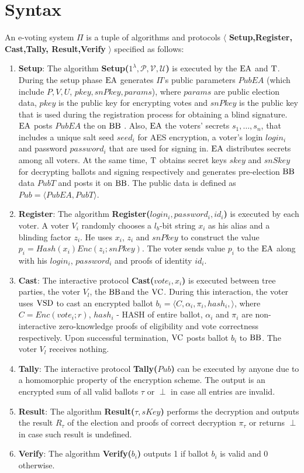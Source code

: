 \section{Syntax}
An e-voting system $\Pi$ is a tuple of algorithms and protocols $\langle$ \textbf{Setup,Register, Cast,Tally, Result,Verify} $\rangle$ specified as follows:
\begin{enumerate}
\item \textbf{Setup}: The algorithm \textbf{Setup($1^{\lambda}, \mathcal{P}, \mathcal{V}, \mathcal{U}$)}  is executed by the $\operatorname{EA}$ and $\operatorname{T}$. During the setup phase $\operatorname{EA}$ generates $\Pi$'s public parameters $PubEA$ (which include $P, V, U$, $pkey, snPkey, params$), where $params$ are public election data, $pkey$ is the public key for encrypting votes and $snPkey$ is the public key that is used during the registration process for obtaining a blind signature. $\operatorname{EA}$ posts  $PubEA$  the on $\operatorname{BB}$ . Also, $\operatorname{EA}$ the voters' secrets $s_1, \dots , s_n$, that includes a unique salt seed $seed_i$ for AES encryption, a voter's login $login_i$ and password $password_i$ that are used for signing in. $\operatorname{EA}$ distributes secrets among all voters. At the same time, $\operatorname{T}$  obtains secret keys $skey$ and $snSkey$ for decrypting ballots and signing respectively and generates pre-election $\operatorname{BB}$ data $PubT$ and posts it on $\operatorname{BB}$. The public data is defined as $Pub = \langle PubEA, PubT \rangle $. 
\item  \textbf{Register}: The algorithm \textbf{Register($login_i,password_i,id_i$)}  is executed by each voter. A voter $V_i$ randomly chooses a $l_b$-bit string $x_i$ as his alias and a blinding factor $z_i$. He uses $x_i$, $z_i$ and $snPkey$ to construct the value $p_i = Hash(x_i)Enc(z_i;snPkey)$. The voter sends value $p_i$ to the $\operatorname{EA}$ along with his $login_i$, $password_i$ and proofs of identity $id_i$.
\item  \textbf{Cast}:  The interactive protocol \textbf{Cast($vote_i,x_i$)} is executed between tree parties, the voter $V_l$, the $\operatorname{BB}$and the $\operatorname{VC}$. During this interaction, the voter uses $\operatorname{VSD}$ to cast an encrypted ballot $b_i = \langle C, \alpha_i, \pi_i, hash_i, \rangle$, where $C=Enc(vote_i;r)$, $hash_i$ - HASH of entire ballot,  $\alpha_i$ and $\pi_i$  are non-interactive zero-knowledge proofs of eligibility and vote correctness respectively. Upon successful termination, $\operatorname{VC}$ posts ballot $b_i$ to $\operatorname{BB}$. The voter $V_l$ receives nothing.
\item  \textbf{Tally}: The interactive protocol \textbf{Tally($Pub$)}  can be executed by anyone due to a homomorphic property of the encryption scheme. The output is an encrypted sum of all valid ballots $\tau$ or $\perp$ in case all entries are invalid.
\item   \textbf{Result}: The algorithm  \textbf{Result($\tau, sKey$)} performs the decryption and outputs the result $R_{\tau}$ of the election and proofs of correct decryption $\pi_{\tau}$ or returns  $\perp$in case such result is undefined.
\item  \textbf{Verify}: The algorithm \textbf{Verify($b_i$)} outputs 1 if ballot $b_i$ is valid and 0 otherwise.
\end{enumerate}

